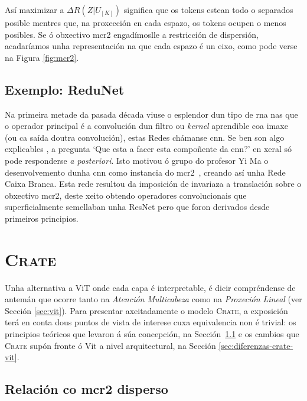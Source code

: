 Así maximizar a $\Delta R(Z | U_{[K]})$ significa que os \glspl{token} estean todo o separados posible mentres que, na proxección en cada espazo, os \glspl{token} ocupen o menos posibles. Se ó obxectivo \acrshort{mcr2} engadímoslle a restricción de dispersión, acadaríamos unha representación  na que cada espazo é un eixo, como pode verse na Figura \ref{fig:mcr2}.




\subsection{Exemplo: ReduNet}

Na primeira metade da pasada década viuse o esplendor dun tipo de \acrshort{rna} nas que o operador principal é a convolución dun filtro ou \emph{kernel} aprendible coa imaxe (ou ca saída doutra convolución), estas Redes chámanse \acrfull{cnn}. Se ben son algo explicables \cite{visualizar_cnn, gradcam}, a pregunta `Que esta a facer esta compoñente da \acrshort{cnn}?' en xeral só pode responderse \emph{a posteriori}. Isto motivou ó grupo do profesor Yi Ma o desenvolvemento dunha \acrshort{cnn} como instancia do \acrshort{mcr2}~\cite{redunet}, creando así unha Rede Caixa Branca. Esta rede resultou da imposición de invariaza a translación sobre o obxectivo \acrshort{mcr2}, deste xeito obtendo operadores convolucionais que superficialmente semellaban unha ResNet pero que foron derivados desde primeiros principios.

\newpage
\section{\textsc{Crate}}
\label{sec:crate}

Unha alternativa a ViT onde cada capa é interpretable, é dicir compréndense de antemán que ocorre tanto na \emph{Atención Multicabeza} como na \emph{Proxeción Lineal} (ver Sección \ref{sec:vit}). Para presentar axeitadamente o modelo \textsc{Crate}, a exposición terá en conta dous puntos de vista de interese cuxa equivalencia non é trivial: os principios teóricos que levaron á súa concepción, na Sección~\ref{sec:principios-crate} e os cambios que \textsc{Crate} supón fronte ó Vit a nivel arquitectural, na Sección \ref{sec:diferenzas-crate-vit}.

\subsection{Relación co \acrshort{mcr2} disperso}
\label{sec:principios-crate}


